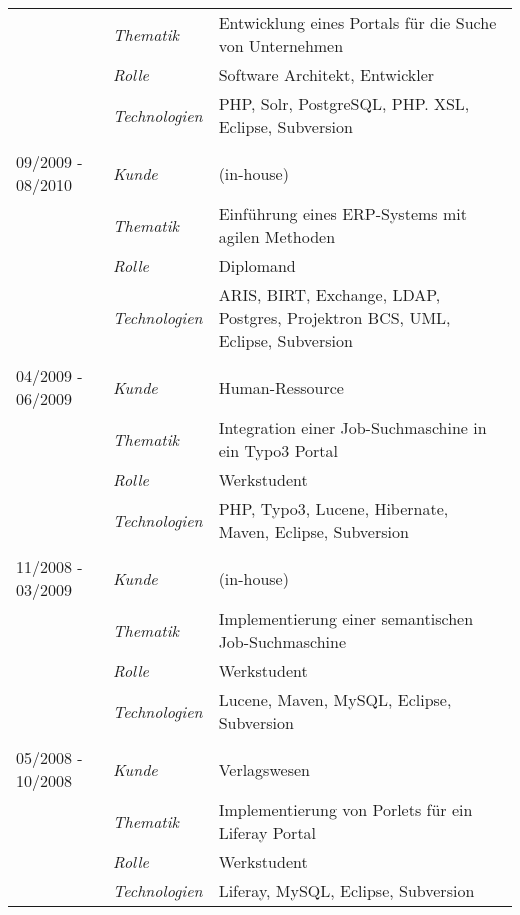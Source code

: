 \begin{longtable}{@{}>{}p{4cm}>{\itshape}p{2cm}>{}p{9cm}}
\nopagebreak		& Thematik	    & Entwicklung eines Portals für die Suche von Unternehmen\\
\nopagebreak		& Rolle 	    & Software Architekt, Entwickler\\
\nopagebreak		& Technologien	& PHP, Solr, PostgreSQL, PHP. XSL, Eclipse, Subversion\\
\\
09/2009 - 08/2010	& Kunde 	    & (in-house)\\
\nopagebreak		& Thematik	    & Einführung eines ERP-Systems mit agilen Methoden\\
\nopagebreak		& Rolle 	    & Diplomand\\
\nopagebreak		& Technologien	& ARIS, BIRT, Exchange, LDAP, Postgres, Projektron BCS, UML, Eclipse, Subversion\\
\\
04/2009 - 06/2009	& Kunde 	    & Human-Ressource\\
\nopagebreak		& Thematik	    & Integration einer Job-Suchmaschine in ein Typo3 Portal\\
\nopagebreak		& Rolle 	    & Werkstudent\\
\nopagebreak		& Technologien	& PHP, Typo3, Lucene, Hibernate, Maven, Eclipse, Subversion\\
\\
11/2008 - 03/2009	& Kunde 	& (in-house)\\
\nopagebreak		& Thematik	& Implementierung einer semantischen Job-Suchmaschine\\
\nopagebreak		& Rolle 	& Werkstudent\\
\nopagebreak		& Technologien	& Lucene, Maven, MySQL, Eclipse, Subversion\\
\\
05/2008 - 10/2008	& Kunde 	& Verlagswesen\\
\nopagebreak		& Thematik	& Implementierung von Porlets für ein Liferay Portal\\
\nopagebreak		& Rolle 	& Werkstudent\\
\nopagebreak		& Technologien	& Liferay, MySQL, Eclipse, Subversion\\
\end{longtable}
\renewcommand{\arraystretch}{2}


